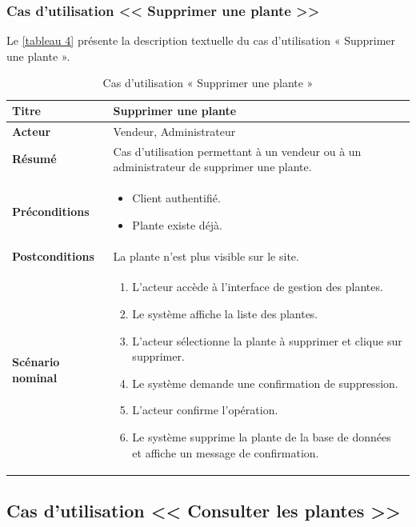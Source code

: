 \subsubsection{Cas d'utilisation << Supprimer une plante >>}

Le \autoref{tableau 4} présente la description textuelle du cas d'utilisation « Supprimer une plante ».

\begin{table}[H]
\centering
\renewcommand{\arraystretch}{1.4}
\begin{tabular}{|p{4cm}|p{10cm}|}
\hline
\textbf{Titre} & Supprimer une plante \\
\hline
\textbf{Acteur} & Vendeur, Administrateur \\
\hline
\textbf{Résumé} & Cas d'utilisation permettant à un vendeur ou à un administrateur de supprimer une plante. \\
\hline
\textbf{Préconditions} &
\vspace{-12pt}
\begin{itemize}
    \item Client authentifié.
    \item Plante existe déjà.
\end{itemize} \\
\hline
\textbf{Postconditions} & La plante n'est plus visible sur le site. \\
\hline
\textbf{Scénario nominal} &
\vspace{-12pt}
\begin{enumerate}
    \item L'acteur accède à l'interface de gestion des plantes.
    \item Le système affiche la liste des plantes.
    \item L'acteur sélectionne la plante à supprimer et clique sur supprimer.
    \item Le système demande une confirmation de suppression.
    \item L'acteur confirme l'opération.
    \item Le système supprime la plante de la base de données et affiche un message de confirmation.
\end{enumerate} \\
\hline
\end{tabular}
\caption{Cas d'utilisation « Supprimer une plante »}
\label{tableau 4}
\end{table}

\subsection{Cas d'utilisation << Consulter les plantes >>}


